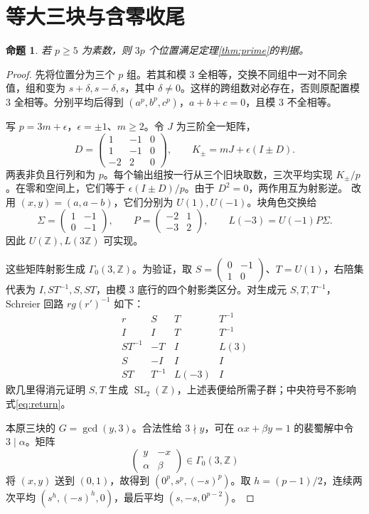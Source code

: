 \documentclass[11pt,a4paper]{article}
\newcommand{\Z}{\mathbb Z}
\newcommand{\SL}{\operatorname{SL}}
\newtheorem{proposition}[theorem]{命题}
\theoremstyle{definition}
\numberwithin{equation}{section}
\begin{document}
\section{等大三块与含零收尾}
\begin{proposition}\label{prop:threep}
若 $p\ge5$ 为素数，则 $3p$ 个位置满足定理\ref{thm:prime}的判据。
\end{proposition}
\begin{proof}
先将位置分为三个 $p$ 组。若其和模 $3$ 全相等，交换不同组中一对不同余值，组和变为 $s+\delta,s-\delta,s$，其中 $\delta\ne0$。这样的跨组数对必存在，否则原配置模 $3$ 全相等。分别平均后得到 $(a^p,b^p,c^p)$，$a+b+c=0$，且模 $3$ 不全相等。

写 $p=3m+\epsilon$，$\epsilon=\pm1$、$m\ge2$。令 $J$ 为三阶全一矩阵，
\[
D=\begin{pmatrix}1&-1&0\\1&-1&0\\-2&2&0\end{pmatrix},\qquad
K_\pm=mJ+\epsilon(I\pm D).
\]
两表非负且行列和为 $p$。每个输出组按一行从三个旧块取数，三次平均实现 $K_\pm/p$。在零和空间上，它们等于 $\epsilon(I\pm D)/p$。由于 $D^2=0$，两作用互为射影逆。
改用 $(x,y)=(a,a-b)$，它们分别为 $U(1),U(-1)$。块角色交换给
\[
\Sigma=\begin{pmatrix}1&-1\\0&-1\end{pmatrix},\qquad
P=\begin{pmatrix}-2&1\\-3&2\end{pmatrix},\qquad
L(-3)=U(-1)P\Sigma.
\]
因此 $U(\Z),L(3\Z)$ 可实现。

这些矩阵射影生成 $\Gamma_0(3,\Z)$。为验证，取 $S=\left(\begin{smallmatrix}0&-1\\1&0\end{smallmatrix}\right)$、$T=U(1)$，右陪集代表为 $I,ST^{-1},S,ST$，由模 $3$ 底行的四个射影类区分。对生成元 $S,T,T^{-1}$，Schreier 回路 $rg(r')^{-1}$ 如下：
\[
\begin{array}{c|ccc}
r&S&T&T^{-1}\\\hline
I&I&T&T^{-1}\\
ST^{-1}&-T&I&L(3)\\
S&-I&I&I\\
ST&T^{-1}&L(-3)&I
\end{array}
\]
欧几里得消元证明 $S,T$ 生成 $\SL_2(\Z)$，上述表便给所需子群；中央符号不影响式\eqref{eq:return}。

本原三块的 $G=\gcd(y,3)$。合法性给 $3\nmid y$，可在 $\alpha x+\beta y=1$ 的裴蜀解中令 $3\mid\alpha$。矩阵
\[
\begin{pmatrix}y&-x\\\alpha&\beta\end{pmatrix}\in\Gamma_0(3,\Z)
\]
将 $(x,y)$ 送到 $(0,1)$，故得到 $(0^p,s^p,(-s)^p)$。取 $h=(p-1)/2$，连续两次平均 $(s^h,(-s)^h,0)$，最后平均 $(s,-s,0^{p-2})$。
\end{proof}
\end{document}
